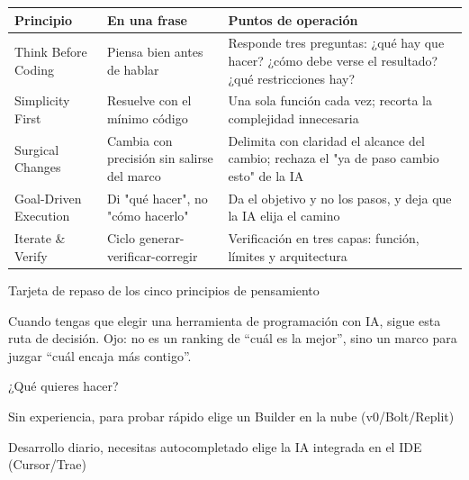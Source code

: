 


\begin{center}
\begin{tabularx}{\linewidth}{|X|X|X|}
\hline
\textbf{Principio} & \textbf{En una frase} & \textbf{Puntos de operación} \tabularnewline
\hline
Think Before Coding & Piensa bien antes de hablar & Responde tres preguntas: ¿qué hay que hacer? ¿cómo debe verse el resultado? ¿qué restricciones hay? \tabularnewline
Simplicity First & Resuelve con el mínimo código & Una sola función cada vez; recorta la complejidad innecesaria \tabularnewline
Surgical Changes & Cambia con precisión sin salirse del marco & Delimita con claridad el alcance del cambio; rechaza el "ya de paso cambio esto" de la IA \tabularnewline
Goal-Driven Execution & Di "qué hacer", no "cómo hacerlo" & Da el objetivo y no los pasos, y deja que la IA elija el camino \tabularnewline
Iterate \& Verify & Ciclo generar-verificar-corregir & Verificación en tres capas: función, límites y arquitectura \tabularnewline
\hline
\end{tabularx}
\end{center}

\begin{center}\small\color{gray}Tarjeta de repaso de los cinco principios de pensamiento\end{center}


Cuando tengas que elegir una herramienta de programación con IA, sigue esta ruta de decisión. Ojo: no es un ranking de “cuál es la mejor”, sino un marco para juzgar “cuál encaja más contigo”.

¿Qué quieres hacer?

Sin experiencia, para probar rápido elige un Builder en la nube (v0/Bolt/Replit)

Desarrollo diario, necesitas autocompletado elige la IA integrada en el IDE (Cursor/Trae)

